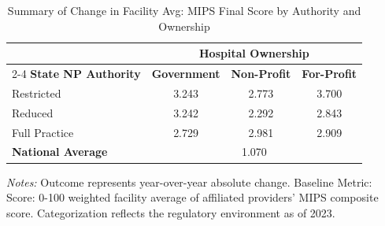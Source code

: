 \begin{table}[htbp]
    \centering
    \caption{Summary of Change in Facility Avg: MIPS Final Score by Authority and Ownership}
    \label{tab:d_mips_final_score_own}
    \vspace{0.2cm}
    \begin{tabular}{lccc}
        \toprule
        & \multicolumn{3}{c}{\textbf{Hospital Ownership}} \\
        \cmidrule(lr){2-4}
        \textbf{State NP Authority} & \textbf{Government} & \textbf{Non-Profit} & \textbf{For-Profit} \\
        \midrule
        Restricted & 3.243 & 2.773 & 3.700 \\
        Reduced & 3.242 & 2.292 & 2.843 \\
        Full Practice & 2.729 & 2.981 & 2.909 \\
        \midrule
        \textbf{National Average} & \multicolumn{3}{c}{1.070} \\
        \bottomrule
    \end{tabular}
    \vspace{0.1cm}
    \begin{minipage}{0.85\textwidth}
        \footnotesize \textit{Notes:} Outcome represents year-over-year absolute change. Baseline Metric: Score: 0-100 weighted facility average of affiliated providers' MIPS composite score. Categorization reflects the regulatory environment as of 2023.
    \end{minipage}
\end{table}